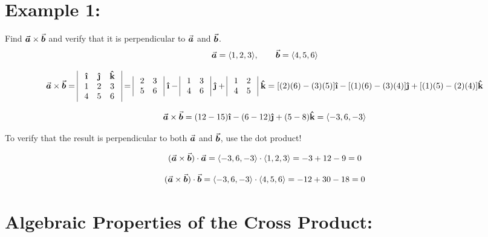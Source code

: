 
\section*{Example 1:} %

Find \(\a \times \b\) and verify that it is perpendicular to \(\a\) and \(\b\).
\[ \a = \<1, 2, 3\>, \qquad \b = \<4, 5, 6\> \]



\[
\a \times \b = \begin{array}{|ccc|}
~\ihat & \jhat & \khat~\\
~1 & 2 & 3~\\
~4 & 5 & 6~
\end{array}
 = \begin{array}{|cc|}
 ~2 & 3~\\
 ~5 & 6~
 \end{array}\ 
 \ihat
 - \begin{array}{|cc|}
 ~1 & 3~\\
~4 & 6~
 \end{array}\ 
 \jhat
 + \begin{array}{|cc|}
~ 1 & 2~\\
 ~4 & 5~
 \end{array}\ 
 \khat
 = [(2) (6) - (3)( 5)] \ihat - [ (1) (6) - (3)( 4)] \jhat + [ (1)( 5) - (2) (4)] \khat
\]

\[
\a \times \b = (12 - 15) \ihat - ( 6 - 12 ) \jhat + ( 5 - 8 ) \khat = \<-3, 6, -3\>
\]

\vfill

To verify that the result is perpendicular to both \(\a\) and \(\b\), use the dot product!

\[
(\a \times \b) \cdot \a = \<-3, 6, -3\> \cdot \<1, 2, 3\> = -3 + 12 -9 = 0
\]

\[
(\a \times \b) \cdot \b = \<-3, 6, -3\> \cdot \<4, 5, 6\> = -12+30-18 = 0
\]

\vfill

\pagebreak


\section*{Algebraic Properties of the Cross Product:}


